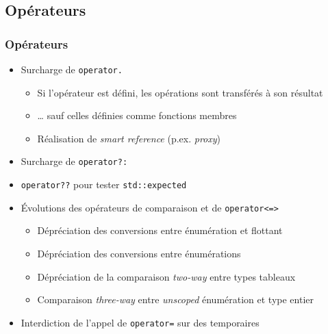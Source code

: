 \documentclass[C++.tex]{subfiles}
\begin{document}
\subsection*{Opérateurs}
\begin{frame}[fragile]
	\frametitle{Opérateurs}
	\begin{itemize}
		\item Surcharge de \lstinline|operator.|
		\begin{itemize}
			\item Si l'opérateur est défini, les opérations sont transférés à son résultat
			\item \ldots{} sauf celles définies comme fonctions membres
			\item Réalisation de \textit{smart reference} (p.ex. \textit{proxy})
		\end{itemize}
		\item Surcharge de \lstinline|operator?:|
		\item \lstinline|operator??| pour tester \lstinline|std::expected|
		\item Évolutions des opérateurs de comparaison et de \lstinline|operator<=>|
		\begin{itemize}
			\item Dépréciation des conversions entre énumération et flottant
			\item Dépréciation des conversions entre énumérations
			\item Dépréciation de la comparaison \og \textit{two-way}\fg{} entre types tableaux
			\item Comparaison \textit{three-way} entre \textit{unscoped} énumération et type entier


		\end{itemize}
		\item Interdiction de l'appel de \lstinline|operator=| sur des temporaires

	\end{itemize}
\end{frame}
\end{document}
